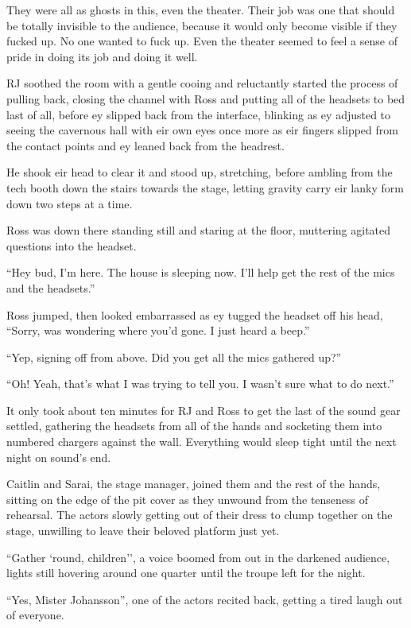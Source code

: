 They were all as ghosts in this, even the theater.  Their job was one that should be totally invisible to the audience, because it would only become visible if they fucked up.  No one wanted to fuck up.  Even the theater seemed to feel a sense of pride in doing its job and doing it well.

RJ soothed the room with a gentle cooing and reluctantly started the process of pulling back, closing the channel with Ross and putting all of the headsets to bed last of all, before ey slipped back from the interface, blinking as ey adjusted to seeing the cavernous hall with eir own eyes once more as eir fingers slipped from the contact points and ey leaned back from the headrest.

He shook eir head to clear it and stood up, stretching, before ambling from the tech booth down the stairs towards the stage, letting gravity carry eir lanky form down two steps at a time.

Ross was down there standing still and staring at the floor, muttering agitated questions into the headset.

``Hey bud, I'm here.  The house is sleeping now.  I'll help get the rest of the mics and the headsets.''

Ross jumped, then looked embarrassed as ey tugged the headset off his head, ``Sorry, was wondering where you'd gone.  I just heard a beep.''

``Yep, signing off from above.  Did you get all the mics gathered up?''

``Oh! Yeah, that's what I was trying to tell you.  I wasn't sure what to do next.''

It only took about ten minutes for RJ and Ross to get the last of the sound gear settled, gathering the headsets from all of the hands and socketing them into numbered chargers against the wall.  Everything would sleep tight until the next night on sound's end.

Caitlin and Sarai, the stage manager, joined them and the rest of the hands, sitting on the edge of the pit cover as they unwound from the tenseness of rehearsal.  The actors slowly getting out of their dress to clump together on the stage, unwilling to leave their beloved platform just yet.

``Gather `round, children'', a voice boomed from out in the darkened audience, lights still hovering around one quarter until the troupe left for the night.

``Yes, Mister Johansson'', one of the actors recited back, getting a tired laugh out of everyone.

